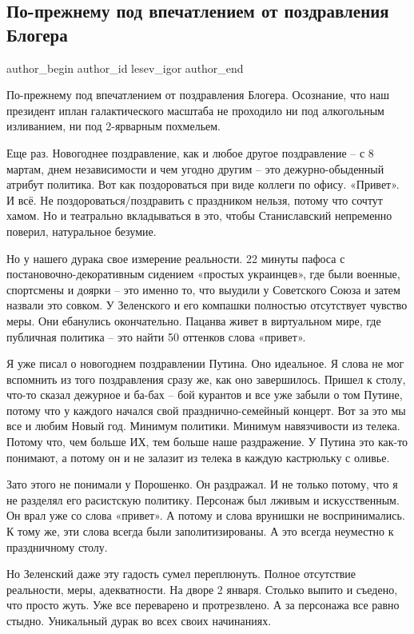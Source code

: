  
 
 
 
 
\subsection{По-прежнему под впечатлением от поздравления Блогера}
\label{sec:02_01_2022.tg.lesev_igor.1.pozdravlenie_zelja}

\ifcmt
 author_begin
   author_id lesev_igor
 author_end
\fi

По-прежнему под впечатлением от поздравления Блогера. Осознание, что наш
президент иплан галактического масштаба не проходило ни под алкогольным
изливанием, ни под 2-ярварным похмельем.

Еще раз. Новогоднее поздравление, как и любое другое поздравление – с 8 мартам,
днем независимости и чем угодно другим – это дежурно-обыденный атрибут
политика. Вот как поздороваться при виде коллеги по офису. «Привет». И всё. Не
поздороваться/поздравить с праздником нельзя, потому что сочтут хамом. Но и
театрально вкладываться в это, чтобы Станиславский непременно поверил,
натуральное безумие.

Но у нашего дурака свое измерение реальности. 22 минуты пафоса с
постановочно-декоративным сидением «простых украинцев», где были военные,
спортсмены и доярки – это именно то, что выудили у Советского Союза и затем
назвали это совком. У Зеленского и его компашки полностью отсутствует чувство
меры. Они ебанулись окончательно. Пацанва живет в виртуальном мире, где
публичная политика – это найти 50 оттенков слова «привет».

Я уже писал о новогоднем поздравлении Путина. Оно идеальное. Я слова не мог
вспомнить из того поздравления сразу же, как оно завершилось. Пришел к столу,
что-то сказал дежурное и ба-бах – бой курантов и все уже забыли о том Путине,
потому что у каждого начался свой празднично-семейный концерт. Вот за это мы
все и любим Новый год. Минимум политики. Минимум навязчивости из телека. Потому
что, чем больше ИХ, тем больше наше раздражение. У Путина это как-то понимают,
а потому он и не залазит из телека в каждую кастрюльку с оливье.

Зато этого не понимали у Порошенко. Он раздражал. И не только потому, что я не
разделял его расистскую политику. Персонаж был лживым и искусственным. Он врал
уже со слова «привет». А потому и слова врунишки не воспринимались. К тому же,
эти слова всегда были заполитизированы. А это всегда неуместно к праздничному
столу.

Но Зеленский даже эту гадость сумел переплюнуть. Полное отсутствие реальности,
меры, адекватности. На дворе 2 января. Столько выпито и съедено, что просто
жуть. Уже все переварено и протрезвлено. А за персонажа все равно стыдно.
Уникальный дурак во всех своих начинаниях.
